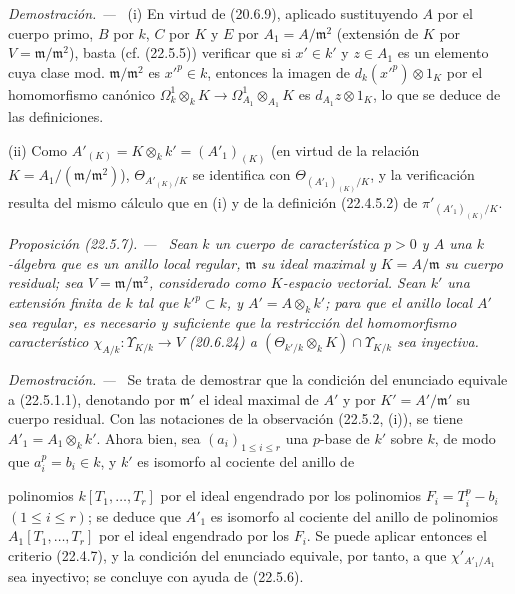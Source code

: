 \documentclass[10pt,oneside]{book}
\makeatletter
\newcommand{\setmanualcurrentlabel}[1]{\def\@currentlabel{#1}}
\newcommand{\oldpage}[2][]{%
  \setcounter{footnote}{0}%
  \marginpar{\scriptsize\textbf{#1}~|~#2}\ignorespaces}
\newenvironment{proposition}[1][]{%
  \setmanualcurrentlabel{#1}\par\medskip\noindent\itshape Proposición (#1). ---\ }{\par}
\newenvironment{proof}{%
  \par\medskip\noindent\textit{Demostración. ---\ }}{\par}
\providecommand{\setmin}{-}%
\makeatother
\begin{document}
\begin{proof}
(i) En virtud de (20.6.9), aplicado sustituyendo $A$ por el cuerpo primo, $B$
por $k$, $C$ por $K$ y $E$ por $A_1=A/\mathfrak m^2$ (extensión de $K$ por
$V=\mathfrak m/\mathfrak m^2$), basta (cf. (22.5.5)) verificar que si
$x'\in k'$ y $z\in A_1$ es un elemento cuya clase mod.
$\mathfrak m/\mathfrak m^2$ es $x'^p\in k$, entonces la imagen de
$d_k(x'^p)\otimes1_K$ por el homomorfismo canónico
$\Omega^1_k\otimes_kK\longrightarrow\Omega^1_{A_1}\otimes_{A_1}K$ es
$d_{A_1}z\otimes1_K$, lo que se deduce de las definiciones.

(ii) Como $A'_{(K)}=K\otimes_kk'=(A'_1)_{(K)}$ (en virtud de la relación
$K=A_1/(\mathfrak m/\mathfrak m^2)$), $\Theta_{A'_{(K)}/K}$ se identifica con
$\Theta_{(A'_1)_{(K)}/K}$, y la verificación resulta del mismo cálculo que en
(i) y de la definición (22.4.5.2) de $\pi'_{(A'_1)_{(K)}/K}$.
\end{proof}

\begin{proposition}[22.5.7]
\label{0.22.5.7-es}
Sean $k$ un cuerpo de característica $p>0$ y $A$ una $k$-álgebra que es un
anillo local regular, $\mathfrak m$ su ideal maximal y $K=A/\mathfrak m$ su
cuerpo residual; sea $V=\mathfrak m/\mathfrak m^2$, considerado como
$K$-espacio vectorial. Sean $k'$ una extensión finita de $k$ tal que
$k'^p\subset k$, y $A'=A\otimes_kk'$; para que el anillo local $A'$ sea
regular, es necesario y suficiente que la restricción del homomorfismo
característico $\chi_{A/k}:\Upsilon_{K/k}\longrightarrow V$ \textup{(20.6.24)} a
$(\Theta_{k'/k}\otimes_kK)\cap\Upsilon_{K/k}$ sea inyectiva.
\end{proposition}

\begin{proof}
Se trata de demostrar que la condición del enunciado equivale a
(22.5.1.1), denotando por $\mathfrak m'$ el ideal maximal de $A'$ y por
$K'=A'/\mathfrak m'$ su cuerpo residual. Con las notaciones de la observación
(22.5.2, (i)), se tiene $A'_1=A_1\otimes_kk'$. Ahora bien, sea
$(a_i)_{1\leqslant i\leqslant r}$ una $p$-base de $k'$ sobre $k$, de modo que
$a_i^p=b_i\in k$, y $k'$ es isomorfo al cociente del anillo de

\oldpage[0\textsubscript{IV-1}]{204}

polinomios $k[T_1,\ldots,T_r]$ por el ideal engendrado por los polinomios
$F_i=T_i^p\setmin b_i$ $(1\leqslant i\leqslant r)$; se deduce que $A'_1$ es
isomorfo al cociente del anillo de polinomios $A_1[T_1,\ldots,T_r]$ por
el ideal engendrado por los $F_i$. Se puede aplicar entonces el criterio (22.4.7), y
la condición del enunciado equivale, por tanto, a que $\chi'_{A'_1/A_1}$ sea
inyectivo; se concluye con ayuda de (22.5.6).
\end{proof}
\end{document}
